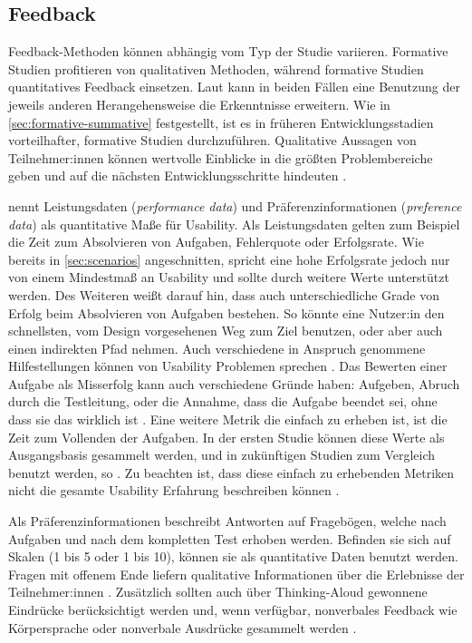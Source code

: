 \subsection{Feedback}
\label{sec:feedback}

Feedback-Methoden können abhängig vom Typ der Studie variieren. Formative Studien profitieren von qualitativen Methoden, während formative Studien quantitatives Feedback einsetzen. Laut \textcite{barnumUsabilityTesting2021} kann in beiden Fällen eine Benutzung der jeweils anderen Herangehensweise die Erkenntnisse erweitern. Wie in \ref{sec:formative-summative} festgestellt, ist es in früheren Entwicklungsstadien vorteilhafter, formative Studien durchzuführen. Qualitative Aussagen von Teilnehmer:innen können wertvolle Einblicke in die größten Problembereiche geben und auf die nächsten Entwicklungsschritte hindeuten \parencite{barnumUsabilityTesting2021}.

\textcite{barnumUsabilityTesting2021} nennt Leistungsdaten (\textit{performance data}) und Präferenzinformationen (\textit{preference data}) als quantitative Maße für Usability. Als Leistungsdaten gelten zum Beispiel die Zeit zum Absolvieren von Aufgaben, Fehlerquote oder Erfolgsrate. Wie bereits in \ref{sec:scenarios} angeschnitten, spricht eine hohe Erfolgsrate jedoch nur von einem Mindestmaß an Usability und sollte durch weitere Werte unterstützt werden. Des Weiteren weißt \textcite{barnumUsabilityTesting2021} darauf hin, dass auch unterschiedliche Grade von Erfolg beim Absolvieren von Aufgaben bestehen. So könnte eine Nutzer:in den schnellsten, vom Design vorgesehenen Weg zum Ziel benutzen, oder aber auch einen indirekten Pfad nehmen. Auch verschiedene in Anspruch genommene Hilfestellungen können von Usability Problemen sprechen \parencite{barnumUsabilityTesting2021}. Das Bewerten einer Aufgabe als Misserfolg kann auch verschiedene Gründe haben: Aufgeben, Abruch durch die Testleitung, oder die Annahme, dass die Aufgabe beendet sei, ohne dass sie das wirklich ist \parencite{barnumUsabilityTesting2021}. Eine weitere Metrik die einfach zu erheben ist, ist die Zeit zum Vollenden der Aufgaben. In der ersten Studie können diese Werte als Ausgangsbasis gesammelt werden, und in zukünftigen Studien zum Vergleich benutzt werden, so \textcite{barnumUsabilityTesting2021}. Zu beachten ist, dass diese einfach zu erhebenden Metriken nicht die gesamte Usability Erfahrung beschreiben können \parencite{barnumUsabilityTesting2021}.

Als Präferenzinformationen beschreibt \textcite{barnumUsabilityTesting2021} Antworten auf Fragebögen, welche nach Aufgaben und nach dem kompletten Test erhoben werden. Befinden sie sich auf Skalen (1 bis 5 oder 1 bis 10), können sie als quantitative Daten benutzt werden. Fragen mit offenem Ende liefern qualitative Informationen über die Erlebnisse der Teilnehmer:innen \parencite{barnumUsabilityTesting2021}. Zusätzlich sollten auch über Thinking-Aloud gewonnene Eindrücke berücksichtigt werden und, wenn verfügbar, nonverbales Feedback wie Körpersprache oder nonverbale Ausdrücke gesammelt werden \parencite{barnumUsabilityTesting2021}.

